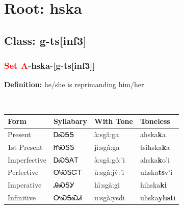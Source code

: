 \needspace{4in}
\section*{Root: hska}
\nopagebreak
{}
\needspace{3in}
\subsection*{Class: g-ts[inf3]}
\nopagebreak
\needspace{2in}
\subsubsection*{\textcolor{Red}{Set A}{-}\textbf{hska}{-}[g-ts[inf3]]}
\nopagebreak
\textbf{Definition: } he/she is reprimanding him/her
\\[0.5em]
\begin{tabularx}{\textwidth}{l X X X}%
\toprule%
\textbf{Form}&\textbf{Syllabary}&\textbf{With Tone}&\textbf{Toneless}\\%
\midrule%
Present&ᎠᏍᎦᎦ&à:sgâ:ga&ahska\textbf{k}a\\%
1st Present&ᏥᏍᎦᎦ&jì:sgâ:ga&tsihska\textbf{k}a\\%
Imperfective&ᎠᏍᎦᎪᎢ&à:sgâ:gó:’i&ahska\textbf{k}o'i\\%
Perfective&ᎤᏍᎦᏨᎢ&ù:sgâ:jv̌:’i&uhska\textbf{ts}v'i\\%
Imperative&ᎯᏍᎦᎩ&hì:sgà:gi&hihska\textbf{ki}\\%
Infinitive&ᎤᏍᎦᏍᏗ&u:sgà:ysdi&uhska\textbf{yhst}i\\%
\bottomrule%
\end{tabularx}
\\[1em]